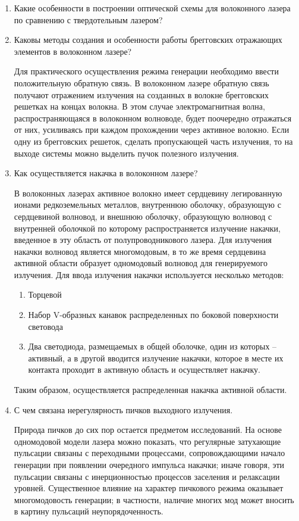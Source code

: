 \documentclass[a4paper, 12pt]{article}
\begin{document}
	\begin{enumerate}
		\item Какие особенности в построении оптической схемы для волоконного лазера по сравнению с твердотельным лазером?\par
		\item Каковы методы создания и особенности работы брегговских отражающих элементов в волоконном лазере?\par
			Для практического осуществления режима генерации необходимо ввести положительную обратную связь. В волоконном лазере обратную связь получают отражением излучения на созданных в волокне брегговских решетках на концах волокна. В этом случае электромагнитная волна, распространяющаяся в волоконном волноводе, будет поочередно отражаться от них, усиливаясь при каждом прохождении через активное волокно. Если одну из брегговских решеток, сделать пропускающей часть излучения, то на выходе системы можно выделить пучок полезного излучения.
		\item Как осуществляется накачка в волоконном лазере?\par
			В волоконных лазерах активное волокно имеет сердцевину легированную ионами редкоземельных металлов, внутреннюю оболочку, образующую с сердцевиной волновод, и внешнюю оболочку, образующую волновод с внутренней оболочкой по которому распространяется излучение накачки, введенное в эту область от полупроводникового лазера. Для излучения накачки волновод является многомодовым, в то же время сердцевина активной области образует одномодовый волновод для генерируемого излучения. Для ввода излучения накачки используется несколько методов:
			\begin{enumerate}
				\item Торцевой
				\item Набор V-образных канавок распределенных по боковой поверхности световода
				\item Два светодиода, размещаемых в общей оболочке, один из которых – активный, а в другой вводится излучение накачки, которое в месте их контакта проходит в активную область и осуществляет накачку.
			\end{enumerate}
			Таким образом, осуществляется распределенная накачка активной области.
			\item С чем связана нерегулярность пичков выходного излучения.\par
				Природа пичков до сих пор остается предметом исследований. На основе одномодовой модели лазера можно показать, что регулярные затухающие пульсации связаны с переходными процессами, сопровождающими начало генерации при появлении очередного импульса накачки; иначе говоря, эти пульсации связаны с инерционностью процессов заселения и релаксации уровней. Существенное влияние на характер пичкового режима оказывает многомодовость генерации; в частности, наличие многих мод может вносить в картину пульсаций неупорядоченность.

\end{enumerate}
\end{document}
